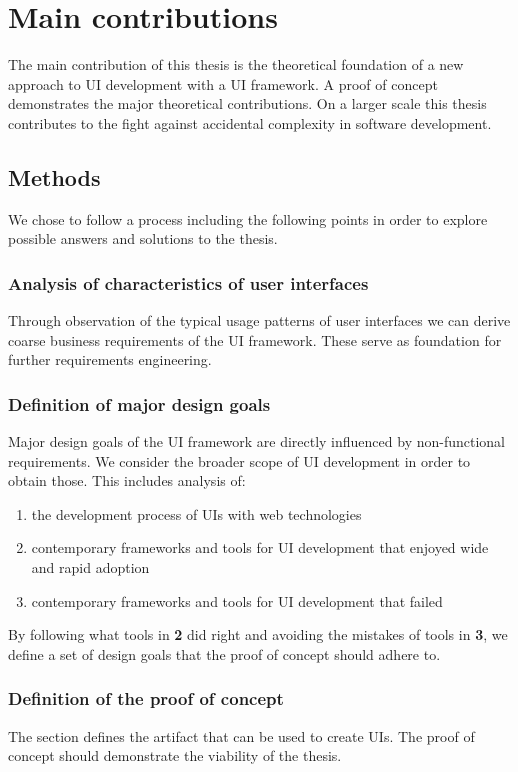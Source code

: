 \section{Main contributions}\label{contributions}
The main contribution of this thesis is the theoretical foundation of a new approach to UI development with a UI framework. A proof of concept demonstrates the major theoretical contributions. On a larger scale this thesis contributes to the fight against accidental complexity in software development.

\subsection{Methods}\label{usecases}
We chose to follow a process including the following points in order to explore possible answers and solutions to the thesis.

\subsubsection{Analysis of characteristics of user interfaces}
Through observation of the typical usage patterns of user interfaces we can derive coarse business requirements of the UI framework. These serve as foundation for further requirements engineering.

\subsubsection{Definition of major design goals}
Major design goals of the UI framework are directly influenced by non-functional requirements. We consider the broader scope of UI development in order to obtain those. This includes analysis of:

\begin{enumerate}
  \item the development process of UIs with web technologies
  \item contemporary frameworks and tools for UI development that enjoyed wide and rapid adoption
  \item contemporary frameworks and tools for UI development that failed
\end{enumerate}

By following what tools in \textbf{2} did right and avoiding the mistakes of tools in \textbf{3}, we define a set of design goals that the proof of concept should adhere to.

\subsubsection{Definition of the proof of concept}
The section defines the artifact that can be used to create UIs. The proof of concept should demonstrate the viability of the thesis.

